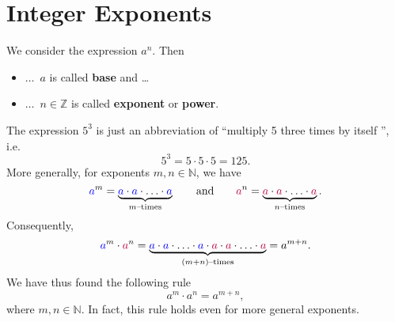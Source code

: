 \section{Integer Exponents}
\begin{tcolorbox}
	We consider the expression $a^n$. Then
	\begin{itemize}
		\item[] $\ldots$\ $a$ is called \textbf{base} and \ldots
		\item[] $\ldots$\ $n\in\mathbb Z$ is called \textbf{exponent} or \textbf{power}.
	\end{itemize}
\end{tcolorbox}
The expression $5^3$ is just an abbreviation of ``multiply 5 three times by itself '', i.e.
\begin{equation*}
	5^3=5\cdot 5\cdot 5=125.
\end{equation*}
More generally, for exponents $m,n\in\mathbb N$, we have
\begin{equation*}
	\textcolor{blue}{a}^m=\underbrace{\textcolor{blue}{a}\cdot\textcolor{blue}{a}\cdot\ldots\cdot\textcolor{blue}{a}}_{m\text{--times}}
	\qquad\text{and}\qquad
	\textcolor{purple}{a}^n=\underbrace{\textcolor{purple}{a}\cdot\textcolor{purple}{a}\cdot\ldots\cdot\textcolor{purple}{a}}_{n\text{--times}}.
\end{equation*}
Consequently,
\begin{equation*}
	\textcolor{blue}{a}^m\cdot\textcolor{purple}{a}^n
	=\underbrace{\textcolor{blue}{a}\cdot\textcolor{blue}{a}\cdot\ldots\cdot\textcolor{blue}{a}
	\cdot\textcolor{purple}{a}\cdot\textcolor{purple}{a}\cdot\ldots\cdot\textcolor{purple}{a}}_{(m+n)\text{--times}}
	=a^{m+n}.
\end{equation*}
We have thus found the following rule
\begin{equation*}
	a^m\cdot a^n=a^{m+n},
\end{equation*}
where $m,n\in\mathbb N$.
In fact, this rule holds even for more general exponents.
